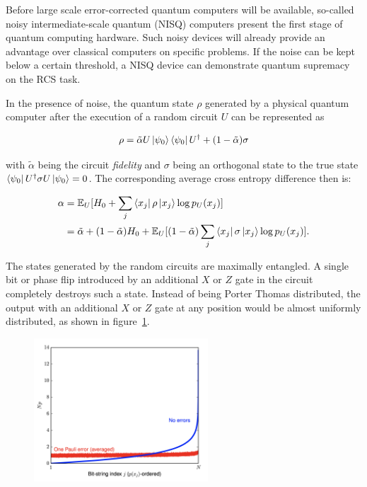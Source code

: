 Before large scale error-corrected quantum computers will be available, so-called noisy intermediate-scale quantum (NISQ) computers present the first stage
of quantum computing hardware. Such noisy devices will already provide an
advantage over classical computers on specific problems. If the noise can be
kept below a certain threshold, a NISQ device can demonstrate quantum
supremacy on the RCS task.

In the presence of noise, the quantum state $\rho$ generated by a physical quantum computer
after the execution of a random circuit $U$ can be represented as

\begin{equation}
  \rho = \tilde{\alpha} U \Ket{\psi_0} \Bra{\psi_0} U^{\dagger} + (1- \tilde{\alpha}) \sigma
\end{equation}

with $\tilde{\alpha}$ being the circuit \textit{fidelity} and $\sigma$ being an orthogonal state to the true state
$\Bra{\psi_0}U^{\dagger}\sigma U \Ket{\psi_0} = 0$.
The corresponding average cross entropy difference then is:

\begin{align}
  \alpha &= \mathbb{E}_U[H_0+ \sum_j \Bra{x_j} \rho \Ket{x_j} \log{p_U(x_j)} ] \\
         &= \tilde{\alpha} + (1-\tilde{\alpha})H_0 + \mathbb{E}_U[(1-\tilde{\alpha}) \sum_j \Bra{x_j} \sigma \Ket{x_j} \log{p_U(x_j)}].
\end{align}

The states generated by the random circuits are
maximally entangled. A single bit or phase flip introduced by an additional $ X $ or $ Z $ gate in the circuit completely destroys such a state. Instead of being Porter Thomas distributed, the output with an additional $X$ or $Z$ gate at any position would be almost uniformly distributed, as shown in figure~\ref{fig:rcs_noise}.

\begin{figure}[H]
  \centering
  \label{fig:rcs_noise}
  \includegraphics[width=0.58\textwidth]{figures/rcs_noise}
\end{figure}

